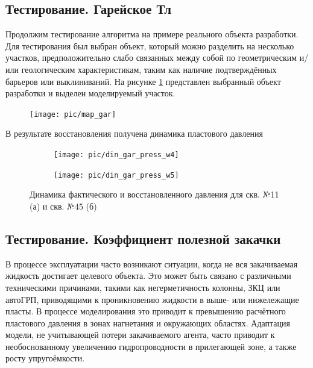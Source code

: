 \documentclass[14pt]{article}
\begin{document}
\subsection{Тестирование. Гарейское Тл}
Продолжим тестирование алгоритма на примере реального объекта разработки.
Для тестирования был выбран объект, который можно разделить на несколько участков, предположительно слабо связанных между собой по геометрическим и/или геологическим характеристикам, таким как наличие подтверждённых барьеров или выклиниваний.
На рисунке \ref{fig:mapgar} представлен выбранный объект разработки и выделен моделируемый участок.
\begin{figure}
	\centering
	\texttt{[image: pic/map\_gar]}
	\caption{}
	\label{fig:mapgar}
\end{figure}

В результате восстановления получена динамика пластового давления 

 \begin{figure}[!htb]
	\centering
	\begin{subfigure}[b]{0.9\linewidth}
		\texttt{[image: pic/din\_gar\_press\_w4]}
		\caption{}
		\label{fig:din_gar_press_11}
	\end{subfigure}
	\begin{subfigure}[b]{0.9\linewidth}
		\texttt{[image: pic/din\_gar\_press\_w5]}
		\caption{}
		\label{fig:din_gar_press_45}
	\end{subfigure}
	\caption{Динамика фактического и восстановленного давления для скв. №11 (а) и скв. №45 (б)}
\end{figure}

\newpage


\subsection{Тестирование. Коэффициент полезной закачки}
В процессе эксплуатации часто возникают ситуации, когда не вся закачиваемая жидкость достигает целевого объекта. Это может быть связано с различными техническими причинами, такими как негерметичность колонны, ЗКЦ или автоГРП, приводящими к проникновению жидкости в выше- или нижележащие пласты.
В процессе моделирования это приводит к превышению расчётного пластового давления в зонах нагнетания и окружающих областях. Адаптация модели, не учитывающей потери закачиваемого агента, часто приводит к необоснованному увеличению гидропроводности в прилегающей зоне, а также росту упругоёмкости.
\end{document}

